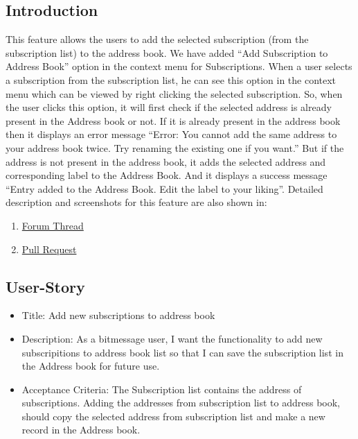 \documentclass[12pt]{article}
\begin{document}
\subsection{Introduction}
This feature allows the users to add the selected subscription (from the subscription list) to the address book. We have added “Add Subscription to Address Book” option in the context menu for Subscriptions. When a user selects a subscription from the subscription list, he can see this option in the context menu which can be viewed by right clicking the selected subscription. So, when the user clicks this option, it will first check if the selected address is already present in the Address book or not. If it is already present in the address book then it displays an error message “Error: You cannot add the same address to your address book twice. Try renaming the existing one if you want.”  But if the address is not present in the address book, it adds the selected address and corresponding label to the Address Book. And it displays a success message “Entry added to the Address Book. Edit the label to your liking”. Detailed description and screenshots for this feature are also shown in:
\begin{enumerate}
\item \href{https://bitmessage.org/forum/index.php?topic=3313.0}{Forum Thread} 
\item \href{https://github.com/Bitmessage/PyBitmessage/pull/555}{Pull Request} 

\end{enumerate}

\subsection{User-Story}
\begin{itemize}
\item Title: Add new subscriptions to address book

\item Description: As a bitmessage user, I want the functionality to add new subscripitions to address book list so that I can save the subscription list in the Address book for future use. 

\item Acceptance Criteria: The Subscription list contains the address of subscriptions. Adding the addresses from subscription list to address book, should copy the selected address from subscription list and make a new record in the Address book.
\end{itemize}
\end{document}
